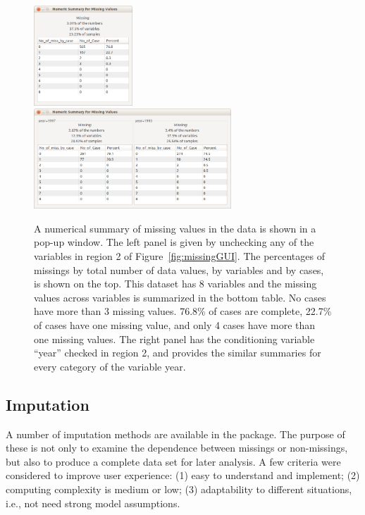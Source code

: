 \documentclass[article]{jss}
\begin{document}
\begin{center}
\begin{figure}[h]
\begin{centering}
\includegraphics[width=0.33\textwidth]{graph/fig2-summary-1}
\includegraphics[width=0.66\textwidth]{graph/fig2-summary-2-condition}
\par\end{centering}
\caption{A numerical summary of missing values in the data is shown in a pop-up window. The left panel is given by unchecking any of the variables in region 2 of Figure~\ref{fig:missingGUI}. The percentages of missings by total number of data values, by variables and by cases, is shown on the top. This dataset has 8 variables and the missing values across variables is summarized in the bottom table. No cases have more than 3 missing values.  76.8\% of cases are complete, 22.7\% of cases have one missing value, and only 4 cases have more than one missing values. The right panel has the conditioning variable ``year'' checked in region 2, and provides the similar summaries for every category of the variable year.}
\label{fig: num-summry}
\end{figure}
\par\end{center}

\subsection{Imputation}\label{imputation}

A number of imputation methods are available in the package. The purpose of these is not only to examine the dependence between missings or non-missings, but also to produce a complete data set for later analysis. A few criteria were considered to improve user experience: (1) easy to understand and implement; (2) computing complexity is medium or low; (3) adaptability to different situations, i.e., not need strong model assumptions.
\end{document}
